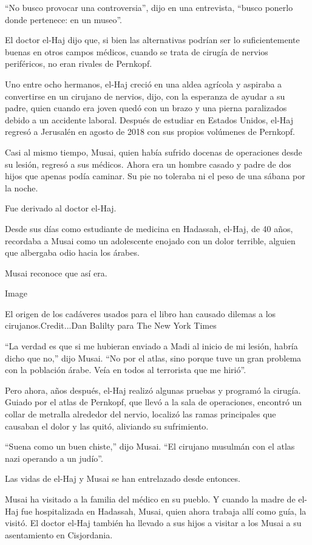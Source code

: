 ``No busco provocar una controversia'', dijo en una entrevista, ``busco
ponerlo donde pertenece: en un museo''.

El doctor el-Haj dijo que, si bien las alternativas podrían ser lo
suficientemente buenas en otros campos médicos, cuando se trata de
cirugía de nervios periféricos, no eran rivales de Pernkopf.

Uno entre ocho hermanos, el-Haj creció en una aldea agrícola y aspiraba
a convertirse en un cirujano de nervios, dijo, con la esperanza de
ayudar a su padre, quien cuando era joven quedó con un brazo y una
pierna paralizados debido a un accidente laboral. Después de estudiar en
Estados Unidos, el-Haj regresó a Jerusalén en agosto de 2018 con sus
propios volúmenes de Pernkopf.

Casi al mismo tiempo, Musai, quien había sufrido docenas de operaciones
desde su lesión, regresó a sus médicos. Ahora era un hombre casado y
padre de dos hijos que apenas podía caminar. Su pie no toleraba ni el
peso de una sábana por la noche.

Fue derivado al doctor el-Haj.

Desde sus días como estudiante de medicina en Hadassah, el-Haj, de 40
años, recordaba a Musai como un adolescente enojado con un dolor
terrible, alguien que albergaba odio hacia los árabes.

Musai reconoce que así era.

Image

El origen de los cadáveres usados para el libro han causado dilemas a
los cirujanos.Credit...Dan Balilty para The New York Times

``La verdad es que si me hubieran enviado a Madi al inicio de mi lesión,
habría dicho que no,'' dijo Musai. ``No por el atlas, sino porque tuve
un gran problema con la población árabe. Veía en todos al terrorista que
me hirió''.

Pero ahora, años después, el-Haj realizó algunas pruebas y programó la
cirugía. Guiado por el atlas de Pernkopf, que llevó a la sala de
operaciones, encontró un collar de metralla alrededor del nervio,
localizó las ramas principales que causaban el dolor y las quitó,
aliviando su sufrimiento.

``Suena como un buen chiste,'' dijo Musai. ``El cirujano musulmán con el
atlas nazi operando a un judío''.

Las vidas de el-Haj y Musai se han entrelazado desde entonces.

Musai ha visitado a la familia del médico en su pueblo. Y cuando la
madre de el-Haj fue hospitalizada en Hadassah, Musai, quien ahora
trabaja allí como guía, la visitó. El doctor el-Haj también ha llevado a
sus hijos a visitar a los Musai a su asentamiento en Cisjordania.

